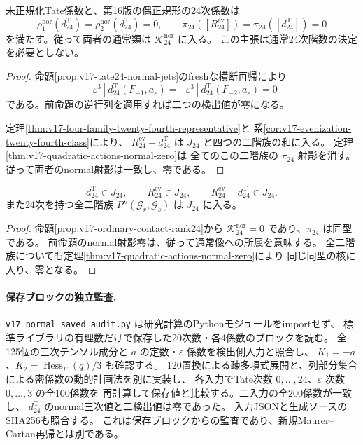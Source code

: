 \begin{proposition}[二十四次の実際のnormal射影は零である]
\label{prop:v17-actual-normal-projection-zero}
未正規化Tate係数と、第16版の偶正規形の24次係数は
\[
 \rho_1^{\mathrm{nor}}(d_{24}^{\mathrm T})
 =\rho_2^{\mathrm{nor}}(d_{24}^{\mathrm T})=0,\qquad
 \pi_{24}([R_{24}^{\mathrm{ev}}])
 =\pi_{24}([d_{24}^{\mathrm T}])=0
\]
を満たす。従って両者の通常類は $\mathcal K_{24}^{\mathrm{nor}}$ に入る。
この主張は通常24次階数の決定を必要としない。
\end{proposition}

\begin{proof}
命題\ref{prop:v17-tate24-normal-jets}のfreshな横断再帰により
\[
 [\varepsilon^3]d_{24}^{\mathrm T}(F_{-1},a_\varepsilon)
 =
 [\varepsilon^3]d_{24}^{\mathrm T}(F_{-2},a_\varepsilon)=0
\]
である。前命題の逆行列を適用すれば二つの検出値が零になる。

定理\ref{thm:v17-four-family-twenty-fourth-representative}と
系\ref{cor:v17-evenization-twenty-fourth-class}により、
$R_{24}^{\mathrm{ev}}-d_{24}^{\mathrm T}$ は $J_{24}$ と四つの二階族の和に入る。
定理\ref{thm:v17-quadratic-actions-normal-zero}は
全てのこの二階族の $\pi_{24}$ 射影を消す。
従って両者のnormal射影は一致し、零である。
\end{proof}

\begin{corollary}[実際の二十四次通常類の消滅]
\label{cor:v17-actual-twenty-fourth-class-zero}
\[
 d_{24}^{\mathrm T}\in J_{24},\qquad
 R_{24}^{\mathrm{ev}}\in J_{24},\qquad
 R_{24}^{\mathrm{ev}}-d_{24}^{\mathrm T}\in J_{24}.
\]
また24次を持つ全二階族 $P''(\mathcal G_r,\mathcal G_s)$ は $J_{24}$ に入る。
\end{corollary}

\begin{proof}
命題\ref{prop:v17-ordinary-contact-rank24}から
$\mathcal K_{24}^{\mathrm{nor}}=0$ であり、$\pi_{24}$ は同型である。
前命題のnormal射影零は、従って通常像への所属を意味する。
全二階族についても定理\ref{thm:v17-quadratic-actions-normal-zero}により
同じ同型の核に入り、零となる。
\end{proof}

\paragraph{保存ブロックの独立監査.}
\nolinkurl{v17_normal_saved_audit.py} は研究計算のPythonモジュールをimportせず、
標準ライブラリの有理数だけで保存した20次数・各4係数のブロックを読む。
全125個の三次テンソル成分と $a$ の定数・$\varepsilon$ 係数を検出側入力と照合し、
$K_1=-a$、$K_2=\operatorname{Hess}_F(q)/3$ も確認する。
120置換による疎多項式展開と、列部分集合による密係数の動的計画法を別に実装し、
各入力でTate次数 $0,\ldots,24$、$\varepsilon$ 次数 $0,\ldots,3$ の全100係数を
再計算して保存値と比較する。二入力の全200係数が一致し、
$d_{24}^{\mathrm T}$ のnormal三次値と二検出値は零であった。
入力JSONと生成ソースのSHA256も照合する。
これは保存ブロックからの監査であり、新規Maurer--Cartan再帰とは別である。


